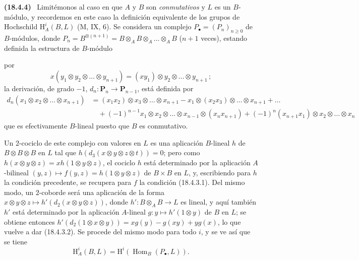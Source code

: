\documentclass[10pt,oneside]{book}
\makeatletter
\newcommand{\setmanualcurrentlabel}[1]{\def\@currentlabel{#1}}
\newcommand{\oldpage}[2][]{%
  \setcounter{footnote}{0}%
  \marginpar{\scriptsize\textbf{#1}~|~#2}\ignorespaces}
\newenvironment{env}[1][]{\setmanualcurrentlabel{#1}\par\medskip\noindent\textbf{(#1)}\ }{\par}
\providecommand{\setmin}{-}%
\makeatother
\begin{document}
\begin{env}[18.4.4]
\label{0.18.4.4-es}
Limitémonos al caso en que $A$ y $B$ son \emph{conmutativos} y $L$ es un
$B$-módulo, y recordemos en este caso la definición equivalente de los grupos
de Hochschild $\mathrm H_A^i(B,L)$ (M, IX, 6). Se considera un complejo
$P_\bullet=(P_n)_{n\geqslant0}$ de $B$-módulos, donde
$P_n=B^{\otimes(n+1)}=B\otimes_A B\otimes_A\ldots\otimes_A B$
($n+1$ veces), estando definida la estructura de $B$-módulo

\oldpage[0\textsubscript{IV-1}]{66}

por
\[
  x(y_1\otimes y_2\otimes\ldots\otimes y_{n+1})
  =(xy_1)\otimes y_2\otimes\ldots\otimes y_{n+1}\,;
\]
la derivación, de grado $-1$, $d_n:\mathbf P_n\to\mathbf P_{n-1}$, está
definida por
\begin{align*}
  d_n(x_1\otimes x_2\otimes\ldots\otimes x_{n+1})
    &=(x_1x_2)\otimes x_3\otimes\ldots\otimes x_{n+1}
      \setmin x_1\otimes(x_2x_3)\otimes\ldots\otimes x_{n+1}+\ldots\\
    &\quad+(\setmin 1)^{n-1}x_1\otimes x_2\otimes\ldots\otimes x_{n-1}
      \otimes(x_nx_{n+1})
      +(\setmin 1)^n(x_{n+1}x_1)\otimes x_2\otimes\ldots\otimes x_n
\end{align*}
que es efectivamente $B$-lineal puesto que $B$ es conmutativo.

Un $2$-cociclo de este complejo con valores en $L$ es una aplicación
$B$-lineal $h$ de $B\otimes B\otimes B$ en $L$ tal que
$h(d_3(x\otimes y\otimes z\otimes t))=0$; pero como
$h(x\otimes y\otimes z)=xh(1\otimes y\otimes z)$, el cociclo $h$ está
determinado por la aplicación $A$-bilineal
$(y,z)\longmapsto f(y,z)=h(1\otimes y\otimes z)$ de $B\times B$ en $L$, y,
escribiendo para $h$ la condición precedente, se recupera para $f$ la
condición (18.4.3.1). Del mismo modo, un $2$-coborde será una aplicación de la
forma $x\otimes y\otimes z\longmapsto h'(d_2(x\otimes y\otimes z))$, donde
$h':B\otimes_A B\to L$ es lineal, y aquí también $h'$ está determinado por la
aplicación $A$-lineal $g:y\longmapsto h'(1\otimes y)$ de $B$ en $L$; se
obtiene entonces
$h'(d_2(1\otimes x\otimes y))=xg(y)-g(xy)+yg(x)$, lo que vuelve a dar
(18.4.3.2). Se procede del mismo modo para todo $i$, y se ve así que se tiene
\begin{equation}
\label{0.18.4.4.1-es}
\tag{18.4.4.1}
  \mathrm H_A^i(B,L)=\mathrm H^i(\operatorname{Hom}_B(P_\bullet,L)).
\end{equation}
\end{env}
\end{document}
